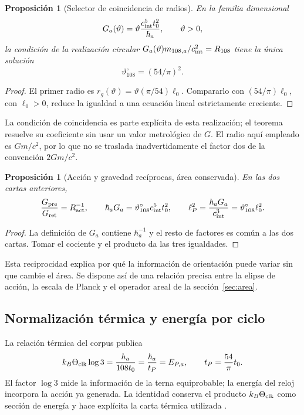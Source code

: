\documentclass[11pt,a4paper]{article}
\numberwithin{equation}{section}
\newtheorem{proposition}[theorem]{Proposición}
\theoremstyle{definition}
\begin{document}
\begin{proposition}[Selector de coincidencia de radios]
En la familia dimensional
\[
G_a(\vartheta)=\vartheta\frac{c_{\rm int}^5t_0^2}{\hbar_a},
\qquad \vartheta>0,
\]
la condición de la realización circular
$G_a(\vartheta)m_{108,a}/c_{\rm int}^2=R_{108}$
tiene la única solución
\[
\vartheta^\circ_{108}=(54/\pi)^2.
\]
\end{proposition}
\begin{proof}
El primer radio es
$r_g(\vartheta)=\vartheta(\pi/54)\ell_0$.
Compararlo con $(54/\pi)\ell_0$, con $\ell_0>0$, reduce la
igualdad a una ecuación lineal estrictamente creciente.
\end{proof}
La condición de coincidencia es parte explícita de esta realización;
el teorema resuelve su coeficiente sin usar un valor metrológico de $G$.
El radio aquí empleado es $Gm/c^2$, por lo que no se traslada
inadvertidamente el factor dos de la convención $2Gm/c^2$.

\begin{proposition}[Acción y gravedad recíprocas, área conservada]
En las dos cartas anteriores,
\[
\frac{G_{\rm pre}}{G_{\rm ret}}=R_{\rm act}^{-1},\qquad
\hbar_aG_a=\vartheta^\circ_{108}c_{\rm int}^5t_0^2,
\qquad
\ell_P^2=\frac{\hbar_aG_a}{c_{\rm int}^3}
=\vartheta^\circ_{108}\ell_0^2.
\]
\end{proposition}
\begin{proof}
La definición de $G_a$ contiene $\hbar_a^{-1}$ y el resto de factores
es común a las dos cartas. Tomar el cociente y el producto da
las tres igualdades.
\end{proof}
Esta reciprocidad explica por qué la información de orientación puede
variar sin que cambie el área. Se dispone así de una relación precisa
entre la elipse de acción, la escala de Planck y el operador areal
de la sección~\ref{sec:area}.

\subsection{Normalización térmica y energía por ciclo}
La relación térmica del corpus publica
\begin{equation}
k_B\Theta_{\rm clk}\log3
=\frac{h_a}{108t_0}
=\frac{\hbar_a}{t_P}=E_{P,a},
\qquad t_P=\frac{54}{\pi}t_0.
\label{eq:thermalclock}
\end{equation}
El factor $\log3$ mide la información de la terna equiprobable;
la energía del reloj incorpora la acción ya generada.
La identidad conserva el producto $k_B\Theta_{\rm clk}$ como sección
de energía y hace explícita la carta térmica utilizada \cite{termica}.
\end{document}
